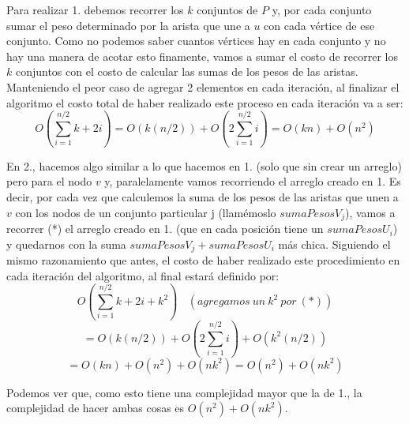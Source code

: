 \documentclass[a4paper]{article}
\begin{document}
Para realizar 1. debemos recorrer los $k$ conjuntos de $P$ y, por cada conjunto sumar el peso determinado por la arista que une a $u$ con cada vértice de ese conjunto. Como no podemos saber cuantos vértices hay en cada conjunto y no hay una manera de acotar esto finamente, vamos a sumar el costo de recorrer los $k$ conjuntos con el costo de calcular las sumas de los pesos de las aristas. Manteniendo el peor caso de agregar 2 elementos en cada iteración, al finalizar el algoritmo el costo total de haber realizado este proceso en cada iteración va a ser:
\[
O(\sum_{i=1}^{n/2}k + 2i) = O(k(n/2)) + O(2\sum_{i=1}^{n/2}i) = O(kn) + O(n^2)
\]

En 2., hacemos algo similar a lo que hacemos en 1. (solo que sin crear un arreglo) pero para el nodo $v$  y, paralelamente vamos recorriendo el arreglo creado en 1. Es decir, por cada vez que calculemos la suma de los pesos de las aristas que unen a $v$ con los nodos de un conjunto particular j (llamémoslo $sumaPesosV_j$), vamos a recorrer (*) el arreglo creado en 1. (que en cada posición tiene un $sumaPesosU_i$) y quedarnos con la suma $sumaPesosV_j + sumaPesosU_i$ más chica.
\newline Siguiendo el mismo razonamiento que antes, el costo de haber realizado este procedimiento en cada iteración del algoritmo, al final estará definido por:
\[
O(\sum_{i=1}^{n/2}k + 2i + k^2) \ \ \ \ (agregamos \ un \ k^2 \ por \ (*))
\]
\[
= O(k(n/2)) + O(2\sum_{i=1}^{n/2}i) + O(k^2(n/2))
\]
\[
= O(kn) + O(n^2) + O(nk^2) = O(n^2) + O(nk^2)
\]

Podemos ver que, como esto tiene una complejidad mayor que la de 1., la complejidad de hacer ambas cosas es $O(n^2) + O(nk^2)$.
\end{document}
